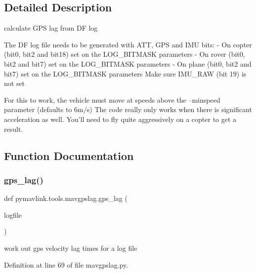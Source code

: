\subsection{Detailed Description}
\begin{DoxyVerb}calculate GPS lag from DF log

The DF log file needs to be generated with ATT, GPS and IMU bits:
-  On copter (bit0, bit2 and bit18) set on the LOG_BITMASK parameters
-  On rover  (bit0, bit2 and bit7) set on the LOG_BITMASK parameters
-  On plane  (bit0, bit2 and bit7) set on the LOG_BITMASK parameters
Make sure IMU_RAW (bit 19) is not set

For this to work, the vehicle must move at speeds above the --minspeed parameter (defaults to 6m/s)
The code really only works when there is significant acceleration as well.
You'll need to fly quite aggressively on a copter to get a result.\end{DoxyVerb}
 

\subsection{Function Documentation}
\mbox{\label{namespacepymavlink_1_1tools_1_1mavgpslag_af4a2cfb91f46374a5585be6ab70d5f4e}} 
\subsubsection{\texorpdfstring{gps\_lag()}{gps\_lag()}}
{\footnotesize\ttfamily def pymavlink.\+tools.\+mavgpslag.\+gps\+\_\+lag (\begin{DoxyParamCaption}\item[{}]{logfile }\end{DoxyParamCaption})}

\begin{DoxyVerb}work out gps velocity lag times for a log file\end{DoxyVerb}
 

Definition at line 69 of file mavgpslag.\+py.

\mbox{\label{namespacepymavlink_1_1tools_1_1mavgpslag_ab86565b5a9f5c4a8ffd725b81faeb819}} 
